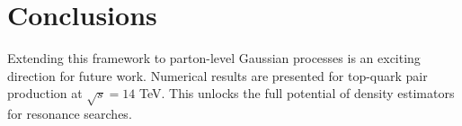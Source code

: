\section{Conclusions}\label{sec:conclusions}

Extending this framework to parton-level Gaussian processes is an
exciting direction for future work. Numerical results are presented for
top-quark pair production at $\sqrt{s} = 14$ TeV. This unlocks the full
potential of density estimators for resonance searches.

